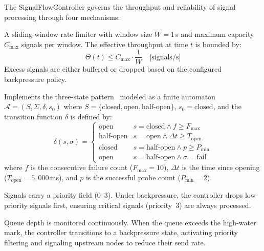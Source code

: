\documentclass[journal,10pt]{IEEEtran}
\begin{document}
The SignalFlowController governs the throughput and reliability of signal processing through four mechanisms:

\begin{description}[nosep,style=unboxed,leftmargin=0pt,font=\normalfont\itshape]
\item[Rate Limiting.] A sliding-window rate limiter with window size $W = 1$\,s and maximum capacity $C_{\max}$ signals per window. The effective throughput at time $t$ is bounded by:
\begin{equation}
\Theta(t) \leq C_{\max} \cdot \frac{1}{W} \quad \text{[signals/s]}
\label{eq:ratelimit}
\end{equation}
Excess signals are either buffered or dropped based on the configured backpressure policy.

\item[Circuit Breaker.] Implements the three-state pattern~\cite{nygard2007} modeled as a finite automaton $\mathcal{A} = (S, \Sigma, \delta, s_0)$ where $S = \{\text{closed}, \text{open}, \text{half-open}\}$, $s_0 = \text{closed}$, and the transition function $\delta$ is defined by:
\begin{equation}
\delta(s, \sigma) = \begin{cases}
\text{open}      & s = \text{closed} \wedge f \geq F_{\max} \\
\text{half-open} & s = \text{open} \wedge \Delta t \geq T_{\text{open}} \\
\text{closed}    & s = \text{half-open} \wedge p \geq P_{\min} \\
\text{open}      & s = \text{half-open} \wedge \sigma = \text{fail}
\end{cases}
\label{eq:circuit}
\end{equation}
where $f$ is the consecutive failure count ($F_{\max} = 10$), $\Delta t$ is the time since opening ($T_{\text{open}} = 5{,}000$\,ms), and $p$ is the successful probe count ($P_{\min} = 2$).

\item[Priority Filtering.] Signals carry a priority field (0--3). Under backpressure, the controller drops low-priority signals first, ensuring critical signals (priority~3) are always processed.

\item[Backpressure.] Queue depth is monitored continuously. When the queue exceeds the high-water mark, the controller transitions to a backpressure state, activating priority filtering and signaling upstream nodes to reduce their send rate.
\end{description}
\end{document}

